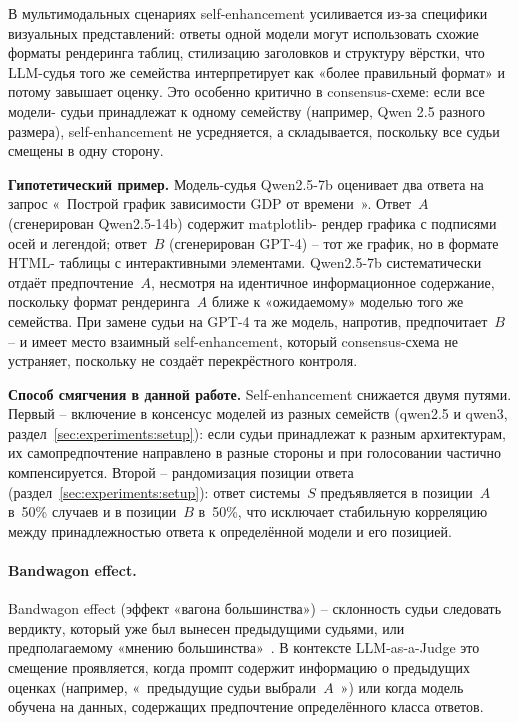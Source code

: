 В мультимодальных сценариях self-enhancement усиливается
из-за специфики визуальных представлений: ответы одной
модели могут использовать схожие форматы рендеринга
таблиц, стилизацию заголовков и структуру вёрстки, что
LLM-судья того же семейства интерпретирует как
«более правильный формат» и потому завышает оценку.
Это особенно критично в consensus-схеме: если все модели-
судьи принадлежат к одному семейству (например, Qwen 2.5
разного размера), self-enhancement не усредняется, а
складывается, поскольку все судьи смещены в одну сторону.

\textbf{Гипотетический пример.}
Модель-судья Qwen2.5-7b оценивает два ответа на запрос
«~Построй график зависимости GDP от времени~».
Ответ~$A$ (сгенерирован Qwen2.5-14b) содержит matplotlib-
рендер графика с подписями осей и легендой; ответ~$B$
(сгенерирован GPT-4) -- тот же график, но в формате HTML-
таблицы с интерактивными элементами.
Qwen2.5-7b систематически отдаёт предпочтение~$A$, несмотря
на идентичное информационное содержание, поскольку формат
рендеринга~$A$ ближе к «ожидаемому» моделью того же
семейства.
При замене судьи на GPT-4 та же модель, напротив,
предпочитает~$B$ -- и имеет место взаимный self-enhancement,
который consensus-схема не устраняет, поскольку не создаёт
перекрёстного контроля.

\textbf{Способ смягчения в данной работе.}
Self-enhancement снижается двумя путями.
Первый -- включение в консенсус моделей из разных семейств
(qwen2.5 и qwen3, раздел~\ref{sec:experiments:setup}):
если судьи принадлежат к разным архитектурам, их
самопредпочтение направлено в разные стороны и при голосовании
 частично компенсируется.
Второй -- рандомизация позиции ответа
(раздел~\ref{sec:experiments:setup}): ответ системы~$S$
предъявляется в позиции~$A$ в~50\% случаев и в позиции~$B$
в~50\%, что исключает стабильную корреляцию между
принадлежностью ответа к определённой модели и его
позицией.

\paragraph{Bandwagon effect.}
Bandwagon effect (эффект «вагона большинства») --
склонность судьи следовать вердикту, который уже был вынесен
предыдущими судьями, или предполагаемому «мнению
большинства»~\cite{ye2024justice}.
В контексте LLM-as-a-Judge это смещение проявляется, когда
промпт содержит информацию о предыдущих оценках (например,
«~предыдущие судьи выбрали~$A$~») или когда модель обучена на
 данных, содержащих предпочтение определённого класса
 ответов.

